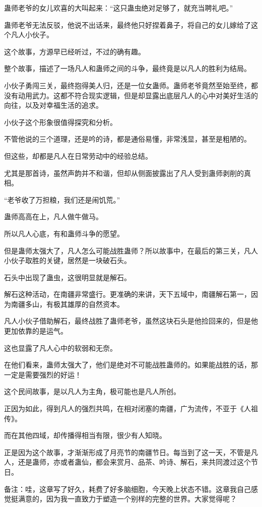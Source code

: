 \begin{this_body}
蛊师老爷的女儿欢喜的大叫起来：“这只蛊虫绝对足够了，就充当聘礼吧。”

蛊师老爷无法反驳，他说不出话来，最终他只好捏着鼻子，将自己的女儿嫁给了这个凡人小伙子。

这个故事，方源早已经听过，不过的确有趣。

整个故事，描述了一场凡人和蛊师之间的斗争，最终竟是以凡人的胜利为结局。

小伙子勇闯三关，最终抱得美人归，还是一位女蛊师。蛊师老爷竟然至始至终，都没有动用武力。这都不符合现实逻辑，但是却显露出底层凡人的心中对美好生活的向往，以及对幸福生活的追求。

小伙子这个形象很值得探究和分析。

不管他说的三个道理，还是吟的诗，都是通俗易懂，非常浅显，甚至是粗陋的。

但这些，却都是凡人在日常劳动中的经验总结。

尤其是那首诗，虽然声韵并不和谐，但却从侧面披露出了凡人受到蛊师剥削的真相。

“老爷收了万担粮，我们还是闹饥荒。”

蛊师高高在上，凡人做牛做马。

所以凡人心底，有和蛊师斗争的愿望。

但是蛊师太强大了，凡人怎么可能战胜蛊师？所以故事中，在最后的第三关，凡人小伙子取胜的关键，居然是一块破石头。

石头中出现了蛊虫，这很明显就是解石。

解石这种活动，在南疆非常盛行。更准确的来讲，天下五域中，南疆解石第一，因为南疆多山，有极其雄厚的自然资本。

凡人小伙子借助解石，最终战胜了蛊师老爷，虽然这块石头是他捡回来的，但是他更加依靠的是运气。

这也显露了凡人心中的软弱和无奈。

在他们看来，蛊师太强大了，他们是绝对不可能战胜蛊师的。如果能战胜的话，那一定是需要强烈的好运！

这个民间故事，是以凡人为主角，极可能也是凡人所创。

正因为如此，得到凡人的强烈共鸣，在相对闭塞的南疆，广为流传，不亚于《人祖传》。

而在其他四域，却传播得相当有限，很少有人知晓。

正是因为这个故事，才渐渐形成了月亮节的南疆节日。每当到了这一天，不管是凡人，还是蛊师，亦或者蛊仙，都会来赏月、品茶、吟诗、解石，来共同渡过这个节日。

备注：哇，这章写了好久，耗费了好多脑细胞，今天晚上状态不错。这章我自己感觉挺满意的，因为我一直致力于塑造一个别样的完整的世界。大家觉得呢？

\end{this_body}

